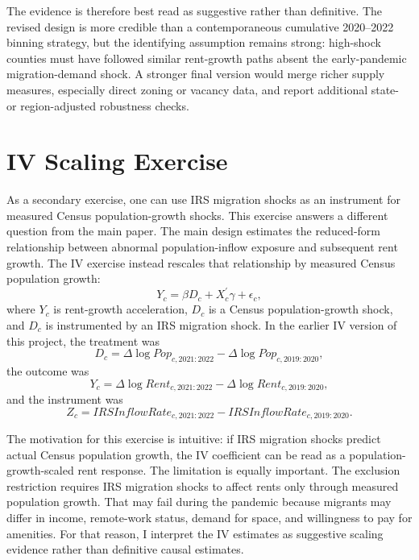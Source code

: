 \documentclass[11pt]{article}
\begin{document}
The evidence is therefore best read as suggestive rather than definitive. The revised design is more credible than a contemporaneous cumulative 2020--2022 binning strategy, but the identifying assumption remains strong: high-shock counties must have followed similar rent-growth paths absent the early-pandemic migration-demand shock. A stronger final version would merge richer supply measures, especially direct zoning or vacancy data, and report additional state- or region-adjusted robustness checks.

\appendix

\section{IV Scaling Exercise}
\label{app:iv}

As a secondary exercise, one can use IRS migration shocks as an instrument for measured Census population-growth shocks. This exercise answers a different question from the main paper. The main design estimates the reduced-form relationship between abnormal population-inflow exposure and subsequent rent growth. The IV exercise instead rescales that relationship by measured Census population growth:
\[
Y_c = \beta D_c + X_c^{\prime}\gamma + \epsilon_c,
\]
where $Y_c$ is rent-growth acceleration, $D_c$ is a Census population-growth shock, and $D_c$ is instrumented by an IRS migration shock. In the earlier IV version of this project, the treatment was
\[
D_c = \Delta \log Pop_{c,2021:2022} - \Delta \log Pop_{c,2019:2020},
\]
the outcome was
\[
Y_c = \Delta \log Rent_{c,2021:2022} - \Delta \log Rent_{c,2019:2020},
\]
and the instrument was
\[
Z_c = IRSInflowRate_{c,2021:2022} - IRSInflowRate_{c,2019:2020}.
\]

The motivation for this exercise is intuitive: if IRS migration shocks predict actual Census population growth, the IV coefficient can be read as a population-growth-scaled rent response. The limitation is equally important. The exclusion restriction requires IRS migration shocks to affect rents only through measured population growth. That may fail during the pandemic because migrants may differ in income, remote-work status, demand for space, and willingness to pay for amenities. For that reason, I interpret the IV estimates as suggestive scaling evidence rather than definitive causal estimates.
\end{document}
